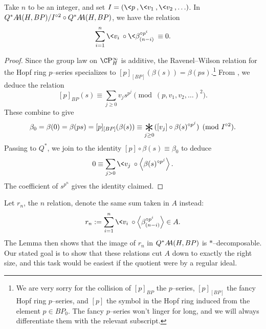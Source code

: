 \begin{lemma}
Take \(n\) to be an integer, and set \(I = (\<p\>, \<v_1\>, \<v_2\>, \ldots)\).  In \(Q^* \AA(H, BP) / I^{\circ 2} \circ Q^* \AA(H, BP)\), we have the relation \[\sum_{i=1}^n \<v_i\> \circ \<\beta_{(n-i)}^{\circ p^i}\> \equiv 0.\]
\end{lemma}
\begin{proof}
Since the group law on \(\CP^\infty_H\) is additive, the Ravenel--Wilson relation for the Hopf ring \(p\)--series specializes to \([p]_{[BP]}(\beta(s)) = \beta(ps)\).\footnote{We are very sorry for the collision of \([p]_{BP}\) the \(p\)--series, \([p]_{[BP]}\) the fancy Hopf ring \(p\)--series, and \([p]\) the symbol in the Hopf ring induced from the element \(p \in BP_0\).  The fancy \(p\)--series won't linger for long, and we will always differentiate them with the relevant subscript.}  From , we deduce the relation \[[p]_{BP}(s) \equiv \sum_{j \ge 0} v_j s^{p^j} \pmod{(p, v_1, v_2, \ldots)^2}.\]  These combine to give \[\beta_0 = \beta(0) = \beta(ps) = [p]_{[BP]}(\beta(s)) \equiv \bigast_{j \ge 0} ([v_j] \circ \beta(s)^{\circ p^j}) \pmod{I^{\circ 2}}.\]  Passing to \(Q^*\), we join  to the identity \([p] \circ \beta(s) \equiv \beta_0\) to deduce \[0 \equiv \sum_{j > 0} \<v_j\> \circ \left\langle\beta(s)^{\circ p^j}\right\rangle.\]  The coefficient of \(s^{p^n}\) gives the identity claimed.
\end{proof}

Let \(r_n\), the \(n\){\th} relation, denote the same sum taken in \(A\) instead: \[r_n := \sum_{i=1}^n \<v_i\> \circ \left\langle\beta_{(n-i)}^{\circ p^i}\right\rangle \in A.\]  The Lemma then shows that the image of \(r_n\) in \(Q^* \AA(H, BP)\) is \(\ast\)--decomposable.  Our stated goal is to show that these relations cut \(A\) down to exactly the right size, and this task would be easiest if the quotient were by a regular ideal.

